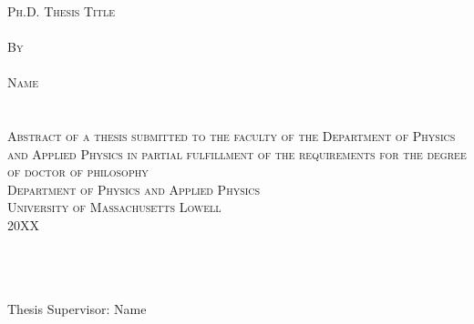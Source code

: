 

\begin{center}
		\hfill \\
		\hfill \\
		\hfill \\
\textsc{\large{
		{Ph.D. Thesis Title}\\
		\hfill \\
		By} \\
		\hfill \\
		\normalsize{Name \\
		\hfill \\
		\hfill \\
		Abstract of a thesis submitted to the faculty of the Department of Physics and Applied Physics in partial fulfillment of the requirements for the degree of doctor of philosophy \\
		Department of Physics and Applied Physics \\
		University of Massachusetts Lowell \\ 20XX}}
		\hfill \\
		\hfill \\
		\hfill \\
		\hfill \\

\end{center}
\vspace{\baselineskip}
\vspace{\baselineskip}
\vspace{\baselineskip}
\vspace{\baselineskip}

\noindent Thesis Supervisor: Name \\

